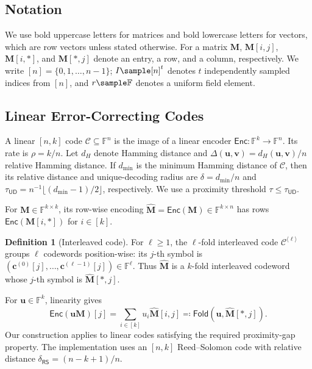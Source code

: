 \documentclass[conference,compsoc]{IEEEtran}
\newcommand{\mat}{\mathbf}          %
\newcommand{\vect}{\mathbf}         %
\renewcommand{\enc}{\mathsf{Enc}}   %
\newcommand{\ud}{{\mathsf{UD}}}
\newcommand{\fold}{\textsf{Fold}}
\theoremstyle{plain}
\theoremstyle{definition}
\newtheorem{definition}[theorem]{Definition}
\theoremstyle{remark}
\begin{document}
\subsection{Notation}
\label{sec:notation}

We use bold uppercase letters for matrices and bold lowercase letters for
vectors, which are row vectors unless stated otherwise.  For a matrix
$\mat{M}$, $\mat{M}[i,j]$, $\mat{M}[i,*]$, and $\mat{M}[*,j]$ denote an entry,
a row, and a column, respectively.  We write $[n]=\{0,1,\ldots,n-1\}$;
$I\sample[n]^t$ denotes $t$ independently sampled indices from $[n]$, and
$r\sample\mathbb{F}$ denotes a uniform field element.

\subsection{Linear Error-Correcting Codes}
\label{sec:prelim-codes}

A linear $[n,k]$ code $\mathcal{C}\subseteq\mathbb{F}^n$ is the image of a
linear encoder $\enc:\mathbb{F}^k\to\mathbb{F}^n$.  Its rate is
$\rho=k/n$.  Let $d_H$ denote Hamming distance and
$\Delta(\vect{u},\vect{v})=d_H(\vect{u},\vect{v})/n$ relative Hamming
distance.  If $d_{\min}$ is the minimum Hamming distance of $\mathcal{C}$,
then its relative distance and unique-decoding radius are
$\delta=d_{\min}/n$ and
$\tau_\ud=n^{-1}\lfloor(d_{\min}-1)/2\rfloor$, respectively.  We use a
proximity threshold $\tau\leq\tau_\ud$.

For $\mat{M}\in\mathbb{F}^{k\times k}$, its row-wise encoding
$\widehat{\mat{M}}=\enc(\mat{M})\in\mathbb{F}^{k\times n}$ has rows
$\enc(\mat{M}[i,*])$ for $i\in[k]$.

\begin{definition}[Interleaved code]\label{def:interleaved-code}
For $\ell\geq1$, the $\ell$-fold interleaved code
$\mathcal{C}^{\langle\ell\rangle}$ groups $\ell$ codewords position-wise:
its $j$-th symbol is
$(\vect{c}^{(0)}[j],\ldots,\vect{c}^{(\ell-1)}[j])\in\mathbb{F}^{\ell}$.
Thus $\widehat{\mat{M}}$ is a $k$-fold interleaved codeword whose $j$-th
symbol is $\widehat{\mat{M}}[*,j]$.
\end{definition}

For $\vect{u}\in\mathbb{F}^k$, linearity gives
\[
  \enc(\vect{u}\mat{M})[j]
  =\sum_{i\in[k]}u_i\widehat{\mat{M}}[i,j]
  \eqqcolon\fold(\vect{u},\widehat{\mat{M}}[*,j]).
\]
Our construction applies to linear codes satisfying the required proximity-gap
property.  The implementation uses an $[n,k]$ Reed--Solomon code with relative
distance $\delta_{\mathsf{RS}}=(n-k+1)/n$.
\end{document}
